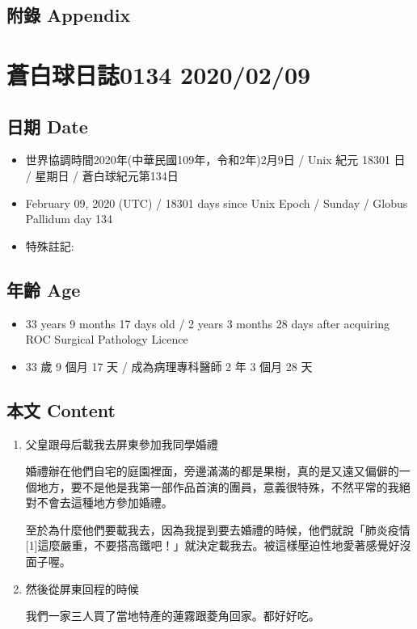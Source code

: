 \documentclass[
]{article}
\providecommand{\tightlist}{%
  \setlength{\itemsep}{0pt}\setlength{\parskip}{0pt}}
\begin{document}
\hypertarget{ux9644ux9304-appendix-7}{%
\subsection{附錄 Appendix}\label{ux9644ux9304-appendix-7}}

\hypertarget{ux84bcux767dux7403ux65e5ux8a8c0134-20200209}{%
\section{蒼白球日誌0134
2020/02/09}\label{ux84bcux767dux7403ux65e5ux8a8c0134-20200209}}

\hypertarget{ux65e5ux671f-date-8}{%
\subsection{日期 Date}\label{ux65e5ux671f-date-8}}

\begin{itemize}
\tightlist
\item
  世界協調時間2020年(中華民國109年，令和2年)2月9日 / Unix 紀元 18301 日
  / 星期日 / 蒼白球紀元第134日
\item
  February 09, 2020 (UTC) / 18301 days since Unix Epoch / Sunday /
  Globus Pallidum day 134
\item
  特殊註記:
\end{itemize}

\hypertarget{ux5e74ux9f61-age-8}{%
\subsection{年齡 Age}\label{ux5e74ux9f61-age-8}}

\begin{itemize}
\tightlist
\item
  33 years 9 months 17 days old / 2 years 3 months 28 days after
  acquiring ROC Surgical Pathology Licence
\item
  33 歲 9 個月 17 天 / 成為病理專科醫師 2 年 3 個月 28 天
\end{itemize}

\hypertarget{ux672cux6587-content-8}{%
\subsection{本文 Content}\label{ux672cux6587-content-8}}

\begin{enumerate}
\def\labelenumi{\arabic{enumi}.}
\item
  父皇跟母后載我去屏東參加我同學婚禮

  婚禮辦在他們自宅的庭園裡面，旁邊滿滿的都是果樹，真的是又遠又偏僻的一個地方，要不是他是我第一部作品首演的團員，意義很特殊，不然平常的我絕對不會去這種地方參加婚禮。

  至於為什麼他們要載我去，因為我提到要去婚禮的時候，他們就說「肺炎疫情{[}1{]}這麼嚴重，不要搭高鐵吧！」就決定載我去。被這樣壓迫性地愛著感覺好沒面子喔。
\item
  然後從屏東回程的時候

  我們一家三人買了當地特產的蓮霧跟菱角回家。都好好吃。
\end{enumerate}
\end{document}
